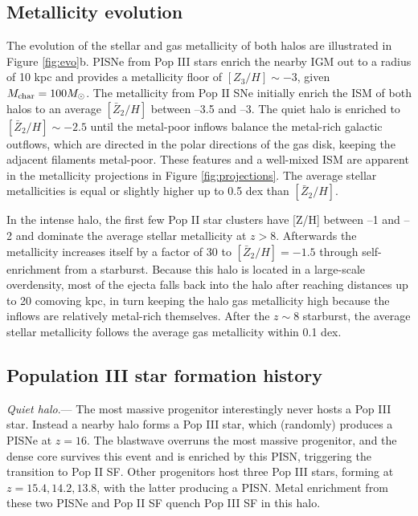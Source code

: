 \documentclass[apjl]{emulateapj}
\begin{document}
\subsection{Metallicity evolution}

The evolution of the stellar and gas metallicity of both halos are
illustrated in Figure \ref{fig:evo}b.  PISNe from Pop III stars enrich
the nearby IGM out to a radius of 10 kpc and provides a metallicity
floor of $[Z_3/H] \sim -3$, given $M_{\rm char} = 100 \Ms$.  The
metallicity from Pop II SNe initially enrich the ISM of both halos to
an average $[\bar{Z}_2/H]$ between --3.5 and --3.  The quiet halo is
enriched to $[\bar{Z}_2/H] \sim -2.5$ until the metal-poor inflows
balance the metal-rich galactic outflows, which are directed in the
polar directions of the gas disk, keeping the adjacent filaments
metal-poor.  These features and a well-mixed ISM
\citep[cf.][]{Wise08_Gal, Greif10} are apparent in the metallicity
projections in Figure \ref{fig:projections}.  The average stellar
metallicities is equal or slightly higher up to 0.5 dex than
$[\bar{Z}_2/H]$.

In the intense halo, the first few Pop II star clusters have [Z/H]
between --1 and --2 and dominate the average stellar metallicity at $z
> 8$.  Afterwards the metallicity increases itself by a factor of 30
to $[\bar{Z}_2/H] = -1.5$ through self-enrichment from a starburst.
Because this halo is located in a large-scale overdensity, most of the
ejecta falls back into the halo after reaching distances up to 20
comoving kpc, in turn keeping the halo gas metallicity high because
the inflows are relatively metal-rich themselves.  After the $z \sim
8$ starburst, the average stellar metallicity follows the average gas
metallicity within 0.1 dex.

\subsection{Population III star formation history}

\textit{Quiet halo}.--- The most massive progenitor interestingly
never hosts a Pop III star.  Instead a nearby halo forms a Pop III
star, which (randomly) produces a PISNe at $z=16$.  The blastwave
overruns the most massive progenitor, and the dense core survives this
event and is enriched by this PISN, triggering the transition to Pop
II SF.  Other progenitors host three Pop III stars, forming at $z =
15.4, 14.2, 13.8$, with the latter producing a PISN.  Metal enrichment
from these two PISNe and Pop II SF quench Pop III SF in this halo.
\end{document}
